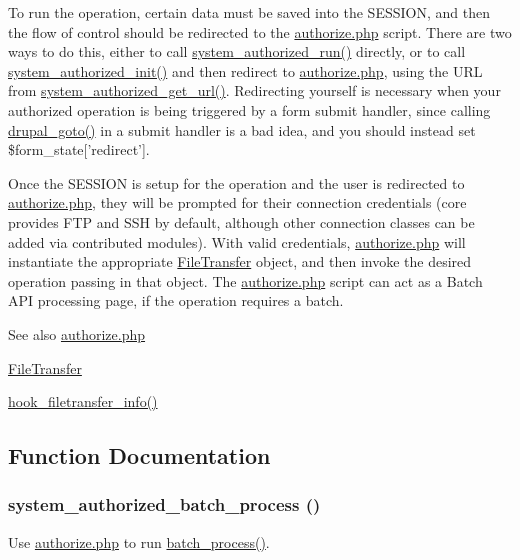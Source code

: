 To run the operation, certain data must be saved into the SESSION, and then the flow of control should be redirected to the \hyperlink{authorize_8php}{authorize.php} script. There are two ways to do this, either to call \hyperlink{group__authorize_gae12fb581acdf9ef042c9137fc6de4d4c}{system\_\-authorized\_\-run()} directly, or to call \hyperlink{group__authorize_ga17756b29805705dbea25798d6004d5dd}{system\_\-authorized\_\-init()} and then redirect to \hyperlink{authorize_8php}{authorize.php}, using the URL from \hyperlink{group__authorize_gab59393fbd369097724650dec4be9c1dd}{system\_\-authorized\_\-get\_\-url()}. Redirecting yourself is necessary when your authorized operation is being triggered by a form submit handler, since calling \hyperlink{group__http__handling_ga5b68d7a934713d1d623b2b32a732235d}{drupal\_\-goto()} in a submit handler is a bad idea, and you should instead set \$form\_\-state\mbox{[}'redirect'\mbox{]}.

Once the SESSION is setup for the operation and the user is redirected to \hyperlink{authorize_8php}{authorize.php}, they will be prompted for their connection credentials (core provides FTP and SSH by default, although other connection classes can be added via contributed modules). With valid credentials, \hyperlink{authorize_8php}{authorize.php} will instantiate the appropriate \hyperlink{classFileTransfer}{FileTransfer} object, and then invoke the desired operation passing in that object. The \hyperlink{authorize_8php}{authorize.php} script can act as a Batch API processing page, if the operation requires a batch.

\begin{DoxySeeAlso}{See also}
\hyperlink{authorize_8php}{authorize.php} 

\hyperlink{classFileTransfer}{FileTransfer} 

\hyperlink{group__hooks_gacecdedb61704444382417e6ec8da240d}{hook\_\-filetransfer\_\-info()} 
\end{DoxySeeAlso}


\subsection{Function Documentation}
\hypertarget{group__authorize_ga049418587e2e337a471f3b707d501196}{
\subsubsection[{system\_\-authorized\_\-batch\_\-process}]{\setlength{\rightskip}{0pt plus 5cm}system\_\-authorized\_\-batch\_\-process ()}}
\label{group__authorize_ga049418587e2e337a471f3b707d501196}
Use \hyperlink{authorize_8php}{authorize.php} to run \hyperlink{group__batch_gab17f59692632a482cee4f65f27d082f7}{batch\_\-process()}.

